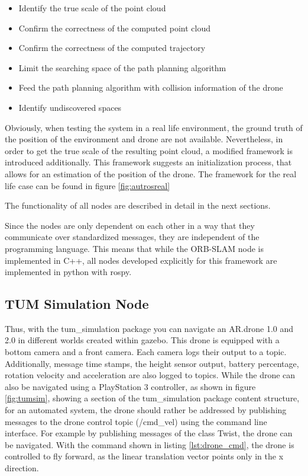 	\begin{itemize}
	
	\item{Identify the true scale of the point cloud}
	\item{Confirm the correctness of the computed point cloud}
	\item{Confirm the correctness of the computed trajectory}
	\item{Limit the searching space of the path planning algorithm}
	\item{Feed the path planning algorithm with collision information of the drone}
	\item{Identify undiscovered spaces} 
	
	\end{itemize}
	
	
	
	Obviously, when testing the system in a real life environment, the ground truth of the position of the environment and drone are not available. 
	Nevertheless, in order to get the true scale of the resulting point cloud, a modified framework is introduced additionally. This framework suggests an 
	initialization process, that allows for an estimation of the position of the drone. The framework for the real life case can be found in figure \ref{fig:autrosreal}
	
	The functionality of all nodes are described in detail in the next sections. 
	
	Since the nodes are only dependent on each other in a way that they communicate over standardized messages, they are independent of the programming language. 
	This means that while the ORB-SLAM node is implemented in C++, all nodes developed explicitly for this framework are implemented in python with rospy. 
	
	\subsection{TUM Simulation Node} \label{tumsec}
	
	
	Thus, with the tum\_simulation package you can navigate an AR.drone 1.0 and 2.0 in different worlds created within gazebo. This drone is equipped with a bottom camera 
	and a front camera. Each camera logs their output to a topic. Additionally, message time stamps, the height sensor output, 
	battery percentage, rotation
	velocity and acceleration are also logged to topics. While the drone can also be navigated using a PlayStation 3 controller, as shown in figure 
	\ref{fig:tumsim}, showing a section of the tum\_simulation package content structure, 
	for an automated system, the drone should rather be addressed by publishing messages to the drone control topic (/cmd\_vel)
	using the command line interface. For example 
	by publishing messages of the class Twist, the drone can be navigated. With the command shown in listing \ref{lst:drone_cmd}, the drone is 
	controlled to fly forward, as the linear translation vector points only in the x direction.  
	
